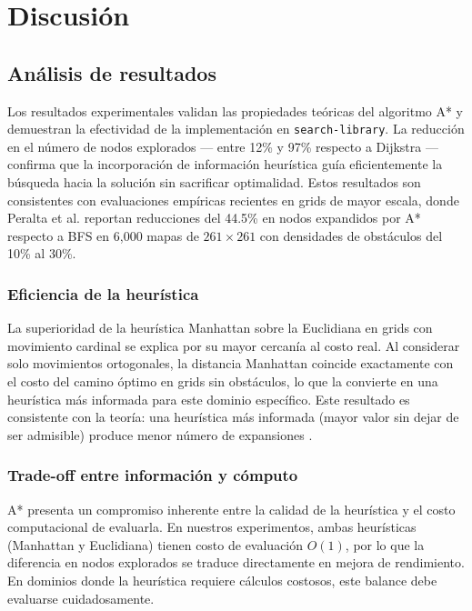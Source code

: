 \section{Discusión}

\subsection{Análisis de resultados}

Los resultados experimentales validan las propiedades teóricas del algoritmo A* y demuestran la efectividad de la implementación en \texttt{search-library}. La reducción en el número de nodos explorados --- entre 12\% y 97\% respecto a Dijkstra --- confirma que la incorporación de información heurística guía eficientemente la búsqueda hacia la solución sin sacrificar optimalidad. Estos resultados son consistentes con evaluaciones empíricas recientes en grids de mayor escala, donde Peralta et al. \cite{peralta2025efficient} reportan reducciones del 44.5\% en nodos expandidos por A* respecto a BFS en 6,000 mapas de $261 \times 261$ con densidades de obstáculos del 10\% al 30\%.

\subsubsection{Eficiencia de la heurística}

La superioridad de la heurística Manhattan sobre la Euclidiana en grids con movimiento cardinal se explica por su mayor cercanía al costo real. Al considerar solo movimientos ortogonales, la distancia Manhattan coincide exactamente con el costo del camino óptimo en grids sin obstáculos, lo que la convierte en una heurística más informada para este dominio específico. Este resultado es consistente con la teoría: una heurística más informada (mayor valor sin dejar de ser admisible) produce menor número de expansiones \cite{pearl1984heuristics}.

\subsubsection{Trade-off entre información y cómputo}

A* presenta un compromiso inherente entre la calidad de la heurística y el costo computacional de evaluarla. En nuestros experimentos, ambas heurísticas (Manhattan y Euclidiana) tienen costo de evaluación $O(1)$, por lo que la diferencia en nodos explorados se traduce directamente en mejora de rendimiento. En dominios donde la heurística requiere cálculos costosos, este balance debe evaluarse cuidadosamente.

